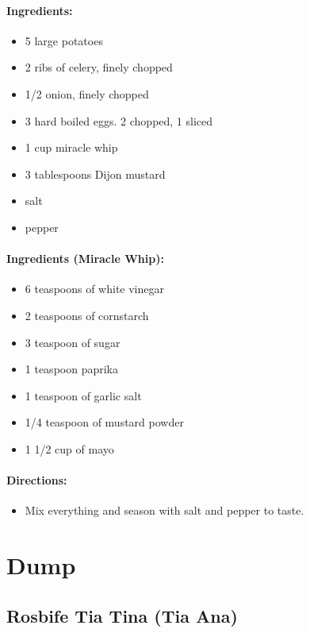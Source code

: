 \documentclass{article}
\begin{document}
\paragraph{Ingredients:}

\begin{itemize}
	\item 5 large potatoes 
	\item 2 ribs of celery, finely chopped 
	\item 1/2 onion, finely chopped 
	\item 3 hard boiled eggs. 2 chopped, 1 sliced 
	\item 1 cup miracle whip 
	\item 3 tablespoons Dijon mustard 
	\item salt 
	\item pepper
\end{itemize}

\paragraph{Ingredients (Miracle Whip):}

\begin{itemize}
	\item 6 teaspoons of white vinegar 
	\item 2 teaspoons of cornstarch 
	\item 3 teaspoon of sugar 
	\item 1 teaspoon paprika 
	\item 1 teaspoon of garlic salt 
	\item 1/4 teaspoon of mustard powder 
	\item 1 1/2 cup of mayo
\end{itemize}

\paragraph{Directions:}
\begin{itemize}
	\item Mix everything and season with salt and pepper to taste.
\end{itemize}

\section{Dump}

\subsection{Rosbife Tia Tina (Tia Ana)}
\end{document}
